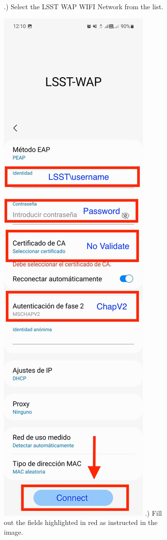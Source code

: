 \begin{figure}
\begin{subfigure}{0.4\textwidth}
      .) Select the LSST WAP WIFI Network from the list.
    \end{subfigure}
      \hfill
    \begin{subfigure}{0.25\textwidth}
      \includegraphics[width=\textwidth]{Images/Android2.jpg}
      .) Fill out the fields highlighted in red as instructed in the image.
    \end{subfigure}
  \end{figure}
